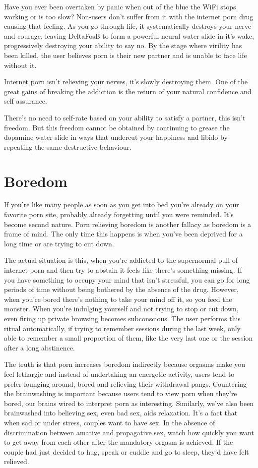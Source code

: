 \documentclass[easypeasy.tex]{subfiles}
\begin{document}
Have you ever been overtaken by panic when out of the blue the WiFi stops working or is too slow? Non-users don't suffer from it with the internet porn drug causing that feeling. As you go through life, it systematically destroys your nerve and courage, leaving DeltaFosB to form a powerful neural water slide in it's wake, progressively destroying your ability to say no. By the stage where virility has been killed, the user believes porn is their new partner and is unable to face life without it.

Internet porn isn't relieving your nerves, it's slowly destroying them. One of the great gains of breaking the addiction is the return of your natural confidence and self assurance.

There's no need to self-rate based on your ability to satisfy a partner, this isn't freedom. But this freedom cannot be obtained by continuing to grease the dopamine water slide in ways that undercut your happiness and libido by repeating the same destructive behaviour.

\section{Boredom}

If you're like many people as soon as you get into bed you're already on your favorite porn site, probably already forgetting until you were reminded. It's become second nature. Porn relieving boredom is another fallacy as boredom is a frame of mind. The only time this happens is when you've been deprived for a long time or are trying to cut down.

The actual situation is this, when you're addicted to the supernormal pull of internet porn and then try to abstain it feels like there's something missing. If you have something to occupy your mind that isn't stressful, you can go for long periods of time without being bothered by the absence of the drug. However, when you're bored there's nothing to take your mind off it, so you feed the monster. When you're indulging yourself and not trying to stop or cut down, even firing up private browsing becomes subconscious. The user performs this ritual automatically, if trying to remember sessions during the last week, only able to remember a small proportion of them, like the very last one or the session after a long abstinence.

The truth is that porn increases boredom indirectly because orgasms make you feel lethargic and instead of undertaking an energetic activity, users tend to prefer lounging around, bored and relieving their withdrawal pangs. Countering the brainwashing is important because users tend to view porn when they're bored, our brains wired to interpret porn as interesting. Similarly, we've also been brainwashed into believing sex, even bad sex, aids relaxation. It's a fact that when sad or under stress, couples want to have sex. In the absence of discrimination between amative and propagative sex, watch how quickly you want to get away from each other after the mandatory orgasm is achieved. If the couple had just decided to hug, speak or cuddle and go to sleep, they'd have felt relieved.
\end{document}
